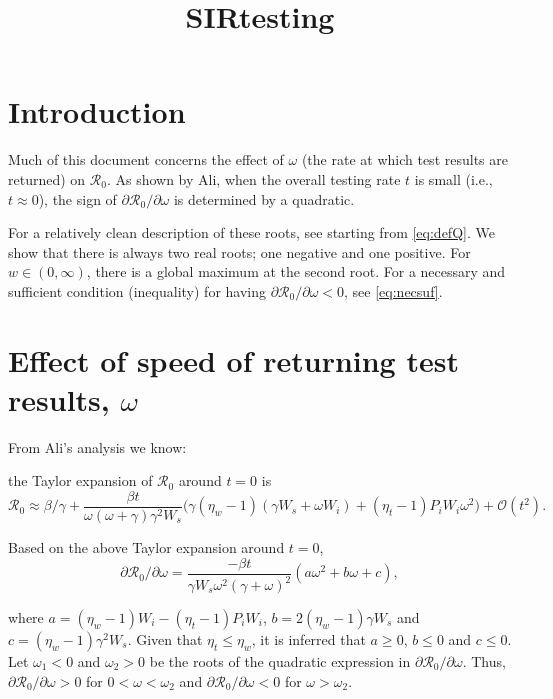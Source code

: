 \documentclass{article}
\title{SIRtesting}
\newcommand{\Rnum}{\mathcal{R}_0}
\begin{document}
\maketitle

\section{Introduction}

Much of this document concerns the effect of $\omega$ (the rate at which test results are returned) on $\Rnum$. As shown by Ali, when the overall testing rate $t$ is small (i.e., $t \approx 0$), the sign of $\partial{\Rnum}/\partial{\omega}$ is determined by a quadratic. 

For a relatively clean description of these roots, see starting from \cref{eq:defQ}. We show that there is always two real roots; one negative and one positive. For $w \in (0, \infty)$, there is a global maximum at the second root. For a necessary and sufficient condition (inequality) for having $\partial{\Rnum}/\partial{\omega} < 0$, see \cref{eq:necsuf}.

\section{Effect of speed of returning test results, $\omega$}

From Ali's analysis we know:

the Taylor expansion of $\Rnum$ around $t=0$ is
\begin{equation}
\Rnum \approx \beta/\gamma + \frac{\beta t}{\omega (\omega+\gamma) \gamma^2 W_s} \Big(\gamma(\eta_w-1)(\gamma W_s+\omega W_i) + (\eta_t -1)P_iW_i \omega^2 \Big) + \mathcal{O}(t^2). 
\end{equation}

Based on the above Taylor expansion around $t=0$, $$\partial{\Rnum}/\partial{\omega}=  \frac{-\beta t}{\gamma W_s\omega^2 (\gamma+\omega)^2}  (a \omega^2 + b \omega + c), $$

where $a=(\eta_w-1)W_i-(\eta_t-1)P_iW_i$, $b=2(\eta_w-1)\gamma W_s$ and $c=(\eta_w-1)\gamma^2 W_s$. Given that $\eta_t\leq \eta_w$, it is inferred that $a\geq 0$, $b\leq 0$ and $c \leq 0$. Let $\omega_1<0$ and $\omega_2>0$ be the roots of the quadratic expression in $\partial{\Rnum}/\partial{\omega}$. Thus, $\partial{\Rnum}/\partial{\omega}>0$ for $0<\omega<\omega_2$ and $\partial{\Rnum}/\partial{\omega}<0$ for $\omega>\omega_2$.

\hrulefill
\end{document}
